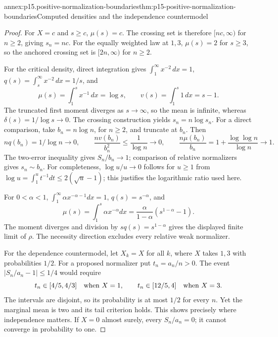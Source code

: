 \begin{annexitem}{annex:p15.positive-normalization-boundaries}{thm:p15-positive-normalization-boundaries}{Computed densities and the independence countermodel}
\begin{proof}
For \(X=c\) and \(s\geq c\), \(\mu(s)=c\).
The crossing set is therefore \([nc,\infty)\) for \(n\geq2\),
giving \(s_n=nc\). For the equally weighted law at \(1,3\),
\(\mu(s)=2\) for \(s\geq3\), so the anchored crossing set
is \([2n,\infty)\) for \(n\geq2\).

For the critical density, direct integration gives
\(\int_1^\infty x^{-2}\,dx=1\),
\(q(s)=\int_s^\infty x^{-2}\,dx=1/s\), and
\[
 \mu(s)=\int_1^s x^{-1}\,dx=\log s,\qquad
 v(s)=\int_1^s1\,dx=s-1.
\]
The truncated first moment diverges as \(s\to\infty\), so the mean is
infinite, whereas \(\delta(s)=1/\log s\to0\).
The crossing construction yields \(s_n=n\log s_n\).
For a direct comparison, take \(b_n=n\log n\), for \(n\geq2\),
and truncate at \(b_n\). Then
\[
 nq(b_n)=1/\log n\to0,\qquad
 \frac{nv(b_n)}{b_n^2}\leq\frac1{\log n}\to0,\qquad
 \frac{n\mu(b_n)}{b_n}
   =1+\frac{\log\log n}{\log n}\to1.
\]
The two-error inequality gives \(S_n/b_n\to1\); comparison of
relative normalizers gives \(s_n\sim b_n\).
For completeness, \(\log u/u\to0\) follows for \(u\geq1\)
from \(\log u=\int_1^u t^{-1}dt\leq2(\sqrt u-1)\);
this justifies the logarithmic ratio used here.

For \(0<\alpha<1\),
\(\int_1^\infty\alpha x^{-\alpha-1}dx=1\),
\(q(s)=s^{-\alpha}\), and
\[
 \mu(s)=\int_1^s\alpha x^{-\alpha}dx
       =\frac{\alpha}{1-\alpha}(s^{1-\alpha}-1).
\]
The moment diverges and division by \(sq(s)=s^{1-\alpha}\)
gives the displayed finite limit of \(\rho\). The necessity
direction excludes every relative weak normalizer.

For the dependence countermodel, let \(X_k=X\) for all \(k\),
where \(X\) takes \(1,3\) with probabilities \(1/2\).
For a proposed normalizer put \(t_n=a_n/n>0\). The event
\(|S_n/a_n-1|\leq1/4\) would require
\[
 t_n\in[4/5,4/3]\quad\hbox{when }X=1,\qquad
 t_n\in[12/5,4]\quad\hbox{when }X=3.
\]
The intervals are disjoint, so its probability is at most \(1/2\)
for every \(n\). Yet the marginal mean is two and its tail
criterion holds. This shows precisely where independence matters.
If \(X=0\) almost surely, every \(S_n/a_n=0\); it cannot
converge in probability to one.
\end{proof}
\end{annexitem}

